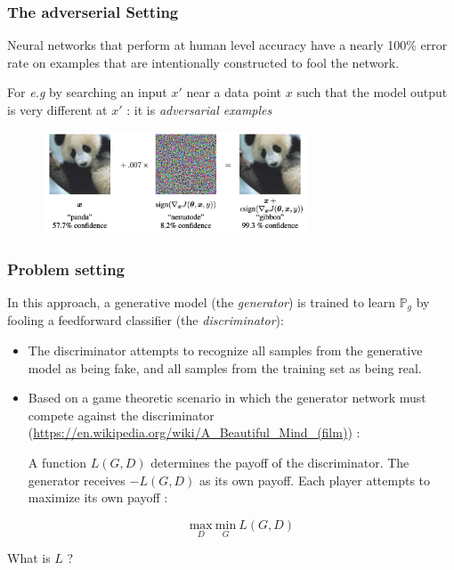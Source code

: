 \documentclass[french,9pt]{beamer}
\begin{document}
\begin{frame}
\frametitle{The adverserial Setting}
Neural networks that perform at human level accuracy have a nearly 100\% error rate on examples that are intentionally constructed to fool the network. 

For \textit{e.g} by searching an input $x'$ near a data point $x$ such that the model output is very different at $x'$ : it is \emph{adversarial examples} \cite{2014arXiv1412.6572G} 

\begin{figure}
  \begin{center}
    \includegraphics[width=0.7\textwidth]{fig/gibon.png}
  \end{center}
\end{figure}


\end{frame}

\begin{frame}
\frametitle{Problem setting}

In this approach, a generative model (the \emph{generator}) is trained to learn $\mathbb{P}_{g}$ by fooling a feedforward classifier (the \emph{discriminator}):
\begin{itemize}
\item The discriminator attempts to recognize all samples from the generative model as being fake, and all samples from the training set as being real.
\pause
\item Based on a game theoretic scenario in which the generator network must compete against the discriminator (\url{https://en.wikipedia.org/wiki/A_Beautiful_Mind_(film)}) :

\pause 

A function $L(G ,D)$ determines the payoff of the discriminator. The generator receives $-L(G ,D)$ as its own payoff. Each player attempts to maximize its own payoff :

$$\underset{D}{\text{max}} \ \underset{G}{\text{min}} \ L(G ,D)$$

\end{itemize}

What is $L$ ?

\end{frame}
\end{document}
